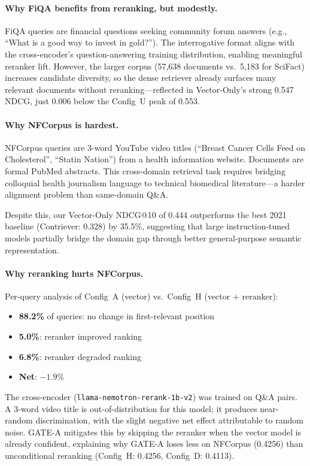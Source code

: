 \documentclass[11pt]{article}
\begin{document}
\paragraph{Why FiQA benefits from reranking, but modestly.}
FiQA queries are financial questions seeking community forum answers (e.g., ``What
is a good way to invest in gold?''). The interrogative format aligns with the
cross-encoder's question-answering training distribution, enabling meaningful reranker
lift. However, the larger corpus (57,638 documents vs.\ 5,183 for SciFact) increases
candidate diversity, so the dense retriever already surfaces many relevant documents
without reranking---reflected in Vector-Only's strong 0.547 NDCG, just 0.006 below
the Config~U peak of 0.553.

\paragraph{Why NFCorpus is hardest.}
NFCorpus queries are 3-word YouTube video titles (``Breast Cancer Cells Feed on
Cholesterol'', ``Statin Nation'') from a health information website. Documents are
formal PubMed abstracts. This cross-domain retrieval task requires bridging colloquial
health journalism language to technical biomedical literature---a harder alignment
problem than same-domain Q\&A.

Despite this, our Vector-Only NDCG@10 of 0.444 outperforms the best 2021 baseline
(Contriever: 0.328) by 35.5\%, suggesting that large instruction-tuned models partially
bridge the domain gap through better general-purpose semantic representation.

\paragraph{Why reranking hurts NFCorpus.}
Per-query analysis of Config~A (vector) vs.\ Config~H (vector + reranker):
\begin{itemize}[leftmargin=2em, itemsep=2pt]
  \item \textbf{88.2\%} of queries: no change in first-relevant position
  \item \textbf{5.0\%}: reranker improved ranking
  \item \textbf{6.8\%}: reranker degraded ranking
  \item \textbf{Net}: $-1.9\%$
\end{itemize}

The cross-encoder (\texttt{llama-nemotron-rerank-1b-v2}) was trained on Q\&A pairs. A
3-word video title is out-of-distribution for this model; it produces near-random
discrimination, with the slight negative net effect attributable to random noise.
GATE-A mitigates this by skipping the reranker when the vector model is already
confident, explaining why GATE-A loses less on NFCorpus (0.4256) than unconditional
reranking (Config~H: 0.4256, Config~D: 0.4113).
\end{document}
